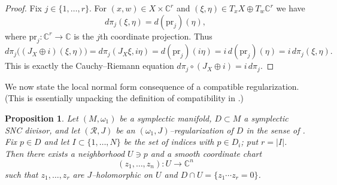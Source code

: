 \documentclass[11pt]{article}
\newtheorem{proposition}[theorem]{Proposition}
\theoremstyle{definition}
\begin{document}
\begin{proof}
Fix $j\in\{1,\dots,r\}$.
For $(x,w)\in X\times\mathbb C^r$ and $(\xi,\eta)\in T_xX\oplus T_w\mathbb C^r$ we have
\[
d\pi_j(\xi,\eta)=d(\mathrm{pr}_j)(\eta),
\]
where $\mathrm{pr}_j:\mathbb C^r\to\mathbb C$ is the $j$th coordinate projection.
Thus
\[
d\pi_j\bigl( (J_X\oplus i)(\xi,\eta)\bigr)
= d\pi_j(J_X\xi, i\eta)
= d(\mathrm{pr}_j)(i\eta)
= i\, d(\mathrm{pr}_j)(\eta)
= i\, d\pi_j(\xi,\eta).
\]
This is exactly the Cauchy--Riemann equation $d\pi_j\circ (J_X\oplus i) = i\, d\pi_j$.
\end{proof}

We now state the local normal form consequence of a compatible regularization.  (This is essentially unpacking the definition of compatibility in \cite{FTZ}.)

\begin{proposition}\label{prop:coordsfromreg}
Let $(M,\omega_1)$ be a symplectic manifold, $D\subset M$ a symplectic SNC divisor, and let $(\mathcal R,J)$ be an $(\omega_1,J)$--regularization of $D$ in the sense of \cite{FTZ}.
Fix $p\in D$ and let $I\subset\{1,\dots,N\}$ be the set of indices with $p\in D_i$; put $r=|I|$.
Then there exists a neighborhood $U\ni p$ and a smooth coordinate chart
\[
(z_1,\dots,z_n):U\to\mathbb C^n
\]
such that $z_1,\dots,z_r$ are $J$--holomorphic on $U$ and $D\cap U=\{z_1\cdots z_r=0\}$.
\end{proposition}
\end{document}
